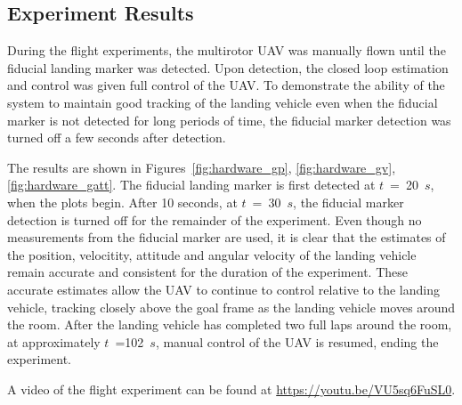 
\subsection{Experiment Results}
During the flight experiments, the multirotor UAV was manually flown until the
fiducial landing marker was detected. Upon detection, the closed loop estimation
and control was given full control of the UAV. To demonstrate the ability of the
system to maintain good tracking of the landing vehicle even when the fiducial
marker is not detected for long periods of time, the fiducial marker detection
was turned off a few seconds after detection.

The results are shown in Figures~\ref{fig:hardware_gp}, \ref{fig:hardware_gv},
\ref{fig:hardware_gatt}. The fiducial landing marker is first detected at
$t$~=~20~$s$, when the plots begin. After 10 seconds, at $t$~=~30~$s$, the
fiducial marker detection is turned off for the remainder of the experiment.
Even though no measurements from the fiducial marker are used, it is clear that
the estimates of the position, velocitity, attitude and angular velocity of the
landing vehicle remain accurate and consistent for the duration of the
experiment. These accurate estimates allow
the UAV to continue to control relative to the landing vehicle, tracking closely
above the goal frame as the landing vehicle moves around the room. After the
landing vehicle has completed two full laps around the room,
at approximately $t$~=102~$s$, manual control of the UAV is resumed, ending the experiment.

A video of the flight experiment can be found at
\url{https://youtu.be/VU5sq6FuSL0}.

